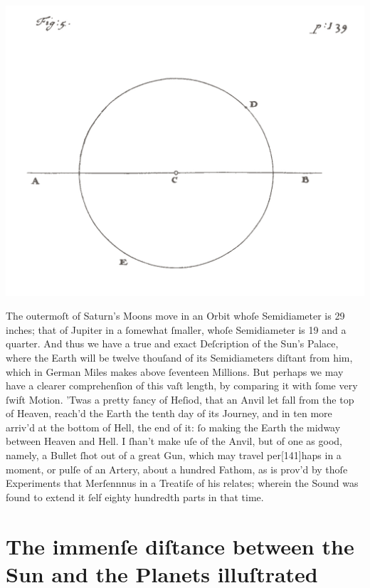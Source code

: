 \documentclass[letterpaper]{book}
\begin{document}
\begin{center}
	\includegraphics[width=.90\textwidth]{ct_5_en.jpg}
\end{center}

The outermoſt of Saturn's Moons move in an Orbit whoſe Semidiameter is
29 inches; that of Jupiter in a ſomewhat ſmaller, whoſe Semidiameter is 19 and
a quarter.  And thus we have a true and exact Deſcription of the Sun's Palace,
where the Earth will be twelve thouſand of its Semidiameters diſtant from him,
which in German Miles makes above ſeventeen Millions. But perhaps we may have a
clearer comprehenſion of this vaſt length, by comparing it with ſome very ſwift
Motion. 'Twas a pretty fancy of Heſiod, that an Anvil let fall from the top of
Heaven, reach'd the Earth the tenth day of its Journey, and in ten more arriv'd
at the bottom of Hell, the end of it: ſo making the Earth the midway between
Heaven and Hell. I ſhan't make uſe of the Anvil, but of one as good, namely, a
Bullet ſhot out of a great Gun, which may travel per[141]haps in a moment, or
pulſe of an Artery, about a hundred Fathom, as is prov'd by thoſe Experiments
that Merſennnus in a Treatiſe of his relates; wherein the Sound was found to
extend it ſelf eighty hundredth parts in that time.


\section{The immenſe diſtance between the Sun and the Planets illuſtrated}
\end{document}
